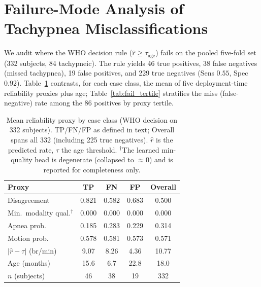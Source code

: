 
\section{Failure-Mode Analysis of Tachypnea Misclassifications}
\label{sec:failure_mode}
We audit where the WHO decision rule ($\hat r \ge \tau_{\text{age}}$) fails on the pooled five-fold set
(332 subjects, 84 tachypneic). The rule yields 46 true positives, 38 false negatives (missed tachypnea),
19 false positives, and 229 true negatives (Sens $0.55$, Spec $0.92$). Table~\ref{tab:fail_means}
contrasts, for each case class, the mean of five deployment-time reliability proxies plus age;
Table~\ref{tab:fail_tertile} stratifies the miss (false-negative) rate among the 86 positives by proxy
tertile.

\begin{table}[!t]
\caption{Mean reliability proxy by case class (WHO decision on 332 subjects). TP/FN/FP as defined in text;
Overall spans all 332 (including 225 true negatives). $\hat r$ is the predicted rate, $\tau$ the age
threshold. $^\dagger$The learned min-quality head is degenerate (collapsed to $\approx 0$) and is reported
for completeness only.}
\label{tab:fail_means}\centering\small
\begin{tabular}{@{}lcccc@{}}\toprule
Proxy & TP & FN & FP & Overall\\\midrule
Disagreement            & 0.821 & 0.582 & 0.683 & 0.500 \\
Min.\ modality qual.$^\dagger$ & 0.000 & 0.000 & 0.000 & 0.000 \\
Apnea prob.             & 0.185 & 0.283 & 0.229 & 0.314 \\
Motion prob.            & 0.578 & 0.581 & 0.573 & 0.571 \\
$|\hat r-\tau|$ (br/min) & 9.07 & 8.26 & 4.36 & 10.77 \\
Age (months)            & 15.6 & 6.7 & 22.8 & 18.0 \\\midrule
$n$ (subjects)          & 46 & 38 & 19 & 332 \\\bottomrule
\end{tabular}
\end{table}

